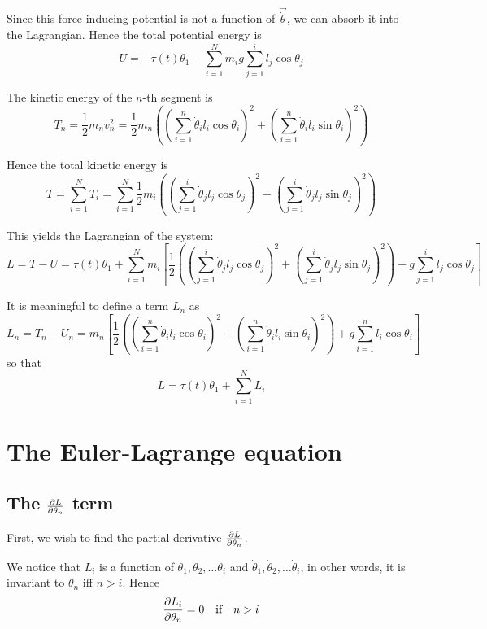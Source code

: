 \documentclass[12pt]{article}
\begin{document}
	Since this force-inducing potential is not a function of $\vec{\dot{\theta}}$, we can absorb it into the Lagrangian. 	Hence the total potential energy is
	$$U=-\tau(t)\theta_1-\sum_{i=1}^N m_ig\sum_{j=1}^i l_j \cos{\theta_j}$$
	
	The kinetic energy of the $n$-th segment is
	$$T_n=\frac{1}{2}m_nv_n^2=\frac{1}{2}m_n\left(\left(\sum_{i=1}^n \dot{\theta}_i l_i \cos{\theta_i}\right)^2+\left(\sum_{i=1}^n \dot{\theta}_i l_i \sin{\theta_i}\right)^2\right)$$
	
	Hence the total kinetic energy is
	$$T=\sum_{i=1}^N T_i = \sum_{i=1}^N \frac{1}{2}m_i\left(\left(\sum_{j=1}^i \dot{\theta}_j l_j \cos{\theta_j}\right)^2+\left(\sum_{j=1}^i \dot{\theta}_j l_j \sin{\theta_j}\right)^2\right)$$
	
	This yields the Lagrangian of the system:
	$$L=T-U=\tau(t)\theta_1+\sum_{i=1}^N m_i \left[\frac{1}{2}\left(\left(\sum_{j=1}^i \dot{\theta}_j l_j \cos{\theta_j}\right)^2+\left(\sum_{j=1}^i \dot{\theta}_j l_j \sin{\theta_j}\right)^2\right)+g\sum_{j=1}^i l_j \cos{\theta_j}\right]$$
	
	It is meaningful to define a term $L_n$ as
	$$L_n=T_n-U_n = m_n\left[\frac{1}{2}\left(\left(\sum_{i=1}^n \dot{\theta}_i l_i \cos{\theta_i}\right)^2+\left(\sum_{i=1}^n \dot{\theta}_i l_i \sin{\theta_i}\right)^2\right)+g\sum_{i=1}^n l_i \cos{\theta_i}\right]$$
	so that
	$$L=\tau(t)\theta_1+\sum_{i=1}^NL_i$$
	
	\section{The Euler-Lagrange equation}
	
	\subsection{The $\pdv{L}{\theta_n}$ term}
	First, we wish to find the partial derivative $\pdv{L}{\theta_n}$.
	
	We notice that $L_i$ is a function of $\theta_1,\theta_2,\dots \theta_i$ and $\dot{\theta}_1,\dot{\theta}_2,\dots \dot{\theta}_i$, in other words, it is invariant to $\theta_n$ iff $n>i$. Hence
	$$\pdv{L_i}{\theta_n}=0\qq{if}n>i$$
	
\end{document}
